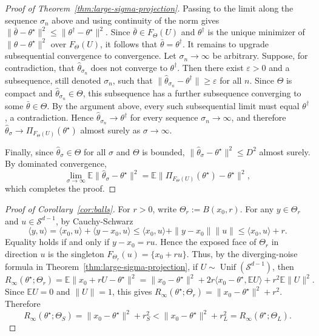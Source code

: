 \documentclass[11pt]{article}
\theoremstyle{plain}
\theoremstyle{definition}
\newcommand{\E}{\mathbb{E}}
\newcommand{\hattheta}{\hat{\theta}}
\newcommand{\mcS}{\mathcal{S}}
\begin{document}
\begin{proof}[Proof of Theorem~\ref{thm:large-sigma-projection}]
Passing to the limit along the sequence $\sigma_n$ above and using continuity of the norm gives $\|\bar\theta-\theta^\star\|^2
\le
\|\theta^\dagger-\theta^\star\|^2$. Since $\bar\theta\in F_\Theta(U)$ and $\theta^\dagger$ is the unique minimizer of
$\|\theta-\theta^\star\|^2$ over $F_\Theta(U)$, it follows that
$\bar\theta=\theta^\dagger$.
 It remains to upgrade subsequential convergence to convergence. Let $\sigma_n\to\infty$ be arbitrary. Suppose, for contradiction, that $\hattheta_{\sigma_n}$ does not converge to $\theta^\dagger$. Then there exist $\varepsilon>0$ and a subsequence, still denoted $\sigma_n$, such that $\|\hattheta_{\sigma_n}-\theta^\dagger\|\ge \varepsilon$ for all $n$. Since $\Theta$ is compact and $\hattheta_{\sigma_n}\in\Theta$, this subsequence has a further subsequence converging to some $\bar\theta\in\Theta$. By the argument above, every such subsequential limit must equal $\theta^\dagger$, a contradiction. Hence $\hattheta_{\sigma_n}\to\theta^\dagger$ for every sequence $\sigma_n\to\infty$, and therefore $ \hattheta_\sigma \to \Pi_{F_\Theta(U)}(\theta^\star)$ almost surely as $\sigma\to\infty$. 

Finally, since $\hattheta_\sigma\in\Theta$ for all $\sigma$ and $\Theta$ is bounded,
$\|\hattheta_\sigma-\theta^\star\|^2\le D^2$ almost surely.
By dominated convergence,
\[
\lim_{\sigma\to\infty}\E\|\hattheta_\sigma-\theta^\star\|^2
=
\E\|\Pi_{F_\Theta(U)}(\theta^\star)-\theta^\star\|^2,
\]
which completes the proof.
\end{proof}


\begin{proof}[Proof of Corollary~\ref{cor:balls}]
For $r>0$, write $\Theta_r:=B(x_0,r)$. For any $y\in\Theta_r$ and $u\in\mcS^{d-1}$, by Cauchy-Schwarz 
\[
    \langle y,u\rangle
    =
    \langle x_0,u\rangle+\langle y-x_0,u\rangle
    \le
    \langle x_0,u\rangle+\|y-x_0\|\|u\|
    \le
    \langle x_0,u\rangle+r.
\]
Equality holds if and only if $y-x_0=ru$. Hence the exposed face of
$\Theta_r$ in direction $u$ is the singleton $F_{\Theta_r}(u)=\{x_0+ru\}$. Thus, by the diverging-noise formula in Theorem~\ref{thm:large-sigma-projection}, if
$U\sim\operatorname{Unif}(\mcS^{d-1})$, then
\[
    R_\infty(\theta^\star;\Theta_r)
    =
    \E\|x_0+rU-\theta^\star\|^2  
    =
    \|x_0-\theta^\star\|^2
    +2r\langle x_0-\theta^\star,\E U\rangle
    +r^2\E\|U\|^2.
\]
Since $\E U=0$ and $\|U\|=1$, this gives $R_\infty(\theta^\star;\Theta_r)
    =
    \|x_0-\theta^\star\|^2+r^2$. Therefore
\[
    R_\infty(\theta^\star;\Theta_S)
    =
    \|x_0-\theta^\star\|^2+r_S^2
    <
    \|x_0-\theta^\star\|^2+r_L^2
    =
    R_\infty(\theta^\star;\Theta_L).
\]
\end{proof}
\end{document}
